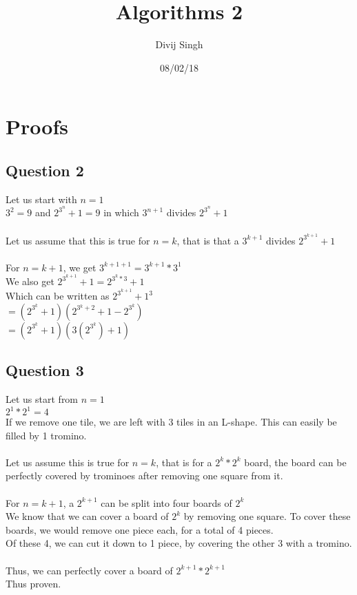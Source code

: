 \documentclass{article}
\title{Algorithms 2}
\author{Divij Singh}
\date{08/02/18}
\begin{document}
	\maketitle
	
	\section{Proofs}
	
	\subsection{Question 2}
		Let us start with $n=1$\\
		$3^2=9$ and $2^{3^n} + 1=9$ in which $3^{n+1}$ divides $2^{3^n} +1$\\
		\\
		Let us assume that this is true for $n=k$, that is that a $3^{k+1}$ divides $2^{3^{k +1}} +1$\\
		\\
		For $n=k+1$, we get $3^{k+1+1}=3^{k+1}*3^1$\\
		We also get $2^{3^{k+1}} +1=2^{3^k * 3} +1$\\
		Which can be written as $2^{3^{k+1}} + 1^3$\\
		$=(2^{3^k}+1)(2^{3{^k} +2} +1 -2^{3^k})$\\
		$=(2^{3^k}+1)(3(2^{3^k}) +1)$
	\subsection{Question 3}
		Let us start from $n=1$\\
		$2^1 * 2^1 =4$\\
		If we remove one tile, we are left with 3 tiles in an L-shape. This can easily be filled by 1 tromino.\\
		\\
		Let us assume this is true for $n=k$, that is for a $2^k*2^k$ board, the board can be perfectly covered by trominoes after removing one square from it.\\
		\\
		For $n=k+1$, a $2^{k+1}$ can be split into four boards of $2^k$\\
		We know that we can cover a board of $2^k$ by removing one square. To cover these boards, we would remove one piece each, for a total of 4 pieces.\\
		Of these 4, we can cut it down to 1 piece, by covering the other 3 with a tromino.\\
		\\
		Thus, we can perfectly cover a board of $2^{k+1}*2^{k+1}$\\
		Thus proven.
		
\end{document}
